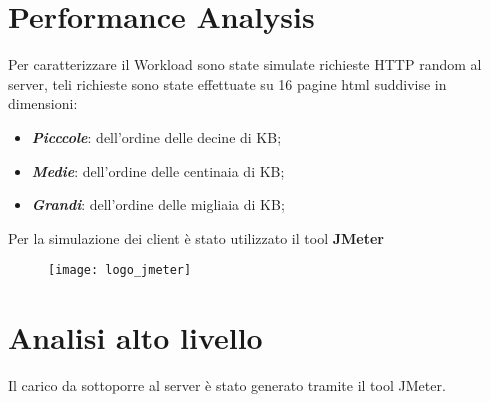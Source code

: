 \section{Performance Analysis}
Per caratterizzare il Workload sono state simulate richieste HTTP random al server,
teli richieste sono state effettuate su 16 pagine html suddivise in dimensioni:

\begin{itemize}
  \item \textbf{\textit{Picccole}}: dell'ordine delle decine di KB;
  \item \textbf{\textit{Medie}}: dell'ordine delle centinaia di KB;
  \item \textbf{\textit{Grandi}}: dell'ordine delle migliaia di KB;
\end{itemize}

Per la simulazione dei client è stato utilizzato il tool \textbf{JMeter}

\begin{figure}[!htbp]
  \texttt{[image: logo\_jmeter]}
\end{figure}

\section{Analisi alto livello}

Il carico da sottoporre al server è stato generato tramite il tool JMeter.\\

